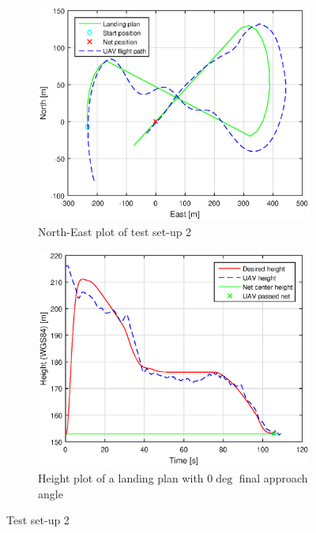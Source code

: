 \begin{figure}[H]
\centering
\begin{subfigure}{0.7\textwidth}
		\includegraphics[width=\textwidth]{figs/Experiment/NorthEast31mai105034.eps}
\caption{North-East plot of test set-up 2}
\label{Fig:NorthEast31mai105034}
\end{subfigure}
\begin{subfigure}{0.7\textwidth}
		\includegraphics[width=\textwidth]{figs/Experiment/Height31mai105034.eps}
		\caption{Height plot of a landing plan with $0 \deg$ final approach angle}
		\label{Fig:Height31mai31mai105034}
\end{subfigure}
\caption{Test set-up 2}
\label{Fig:Test2}
\end{figure}

